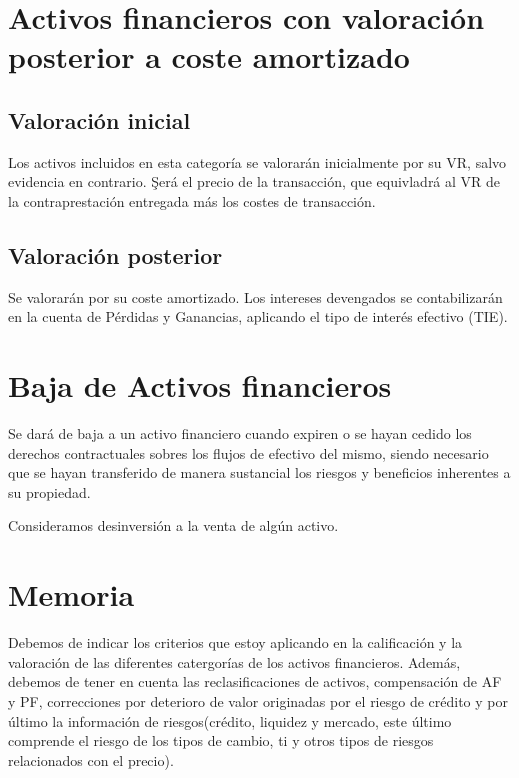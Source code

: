 \section{Activos financieros con valoración posterior a coste amortizado}

\subsection{Valoración inicial}

Los activos incluidos en esta categoría se valorarán inicialmente por su VR, salvo evidencia en contrario. \c{Será el precio de la transacción, que equivladrá al VR de la contraprestación entregada más los costes de transacción.}

\subsection{Valoración posterior}

Se valorarán por su coste amortizado. Los intereses devengados se contabilizarán en la cuenta de Pérdidas y Ganancias, aplicando el tipo de interés efectivo (TIE).






\newpage
\section{Baja de Activos financieros}

Se dará de baja a un activo financiero cuando expiren o se hayan cedido los derechos contractuales sobres los flujos de efectivo del mismo, siendo necesario que se hayan transferido de manera sustancial los riesgos y beneficios inherentes a su propiedad. 











Consideramos desinversión a la venta de algún activo. 
\newpage
\section{Memoria}

Debemos de indicar los criterios que estoy aplicando en la calificación y la valoración de las diferentes catergorías de los activos financieros. 
Además, debemos de tener en cuenta las reclasificaciones de activos, compensación de AF y PF, correcciones por deterioro de valor originadas por el riesgo de crédito y por último la información de riesgos(crédito, liquidez y mercado, este último comprende el riesgo de los tipos de cambio, ti y otros tipos de riesgos relacionados con el precio).


